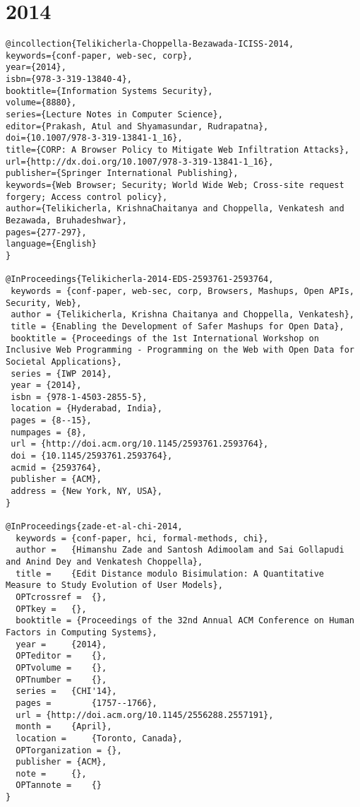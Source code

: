 \documentclass[11pt]{article}
\begin{document}
\section{2014}
\label{sec:orga9f42ad}
\lstset{language=bibtex,label= ,caption= ,captionpos=b,numbers=none}
\begin{lstlisting}
@incollection{Telikicherla-Choppella-Bezawada-ICISS-2014,
keywords={conf-paper, web-sec, corp},
year={2014},
isbn={978-3-319-13840-4},
booktitle={Information Systems Security},
volume={8880},
series={Lecture Notes in Computer Science},
editor={Prakash, Atul and Shyamasundar, Rudrapatna},
doi={10.1007/978-3-319-13841-1_16},
title={CORP: A Browser Policy to Mitigate Web Infiltration Attacks},
url={http://dx.doi.org/10.1007/978-3-319-13841-1_16},
publisher={Springer International Publishing},
keywords={Web Browser; Security; World Wide Web; Cross-site request forgery; Access control policy},
author={Telikicherla, KrishnaChaitanya and Choppella, Venkatesh and Bezawada, Bruhadeshwar},
pages={277-297},
language={English}
}

@InProceedings{Telikicherla-2014-EDS-2593761-2593764,
 keywords = {conf-paper, web-sec, corp, Browsers, Mashups, Open APIs, Security, Web},
 author = {Telikicherla, Krishna Chaitanya and Choppella, Venkatesh},
 title = {Enabling the Development of Safer Mashups for Open Data},
 booktitle = {Proceedings of the 1st International Workshop on Inclusive Web Programming - Programming on the Web with Open Data for Societal Applications},
 series = {IWP 2014},
 year = {2014},
 isbn = {978-1-4503-2855-5},
 location = {Hyderabad, India},
 pages = {8--15},
 numpages = {8},
 url = {http://doi.acm.org/10.1145/2593761.2593764},
 doi = {10.1145/2593761.2593764},
 acmid = {2593764},
 publisher = {ACM},
 address = {New York, NY, USA},
}

@InProceedings{zade-et-al-chi-2014,
  keywords = {conf-paper, hci, formal-methods, chi},
  author = 	 {Himanshu Zade and Santosh Adimoolam and Sai Gollapudi and Anind Dey and Venkatesh Choppella},
  title = 	 {Edit Distance modulo Bisimulation: A Quantitative Measure to Study Evolution of User Models},
  OPTcrossref =  {},
  OPTkey = 	 {},
  booktitle = {Proceedings of the 32nd Annual ACM Conference on Human Factors in Computing Systems},
  year = 	 {2014},
  OPTeditor = 	 {},
  OPTvolume = 	 {},
  OPTnumber = 	 {},
  series = 	 {CHI'14},
  pages =        {1757--1766},
  url = {http://doi.acm.org/10.1145/2556288.2557191},
  month = 	 {April},
  location = 	 {Toronto, Canada},
  OPTorganization = {},
  publisher = {ACM},
  note = 	 {},
  OPTannote = 	 {}
}



\end{lstlisting}
\end{document}
